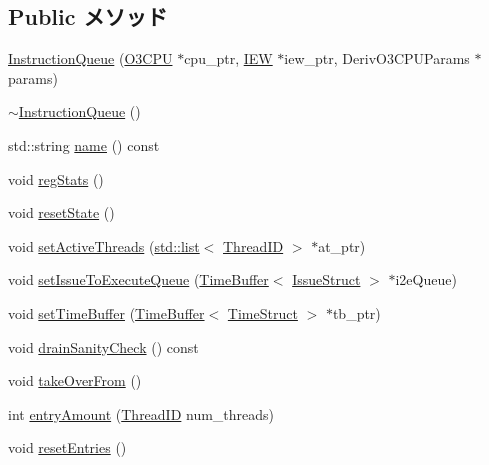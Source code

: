 \subsection*{Public メソッド}
\begin{DoxyCompactItemize}
\item 
\hyperlink{classInstructionQueue_a70773a251ef988cdd7b3fa494aed7a72}{InstructionQueue} (\hyperlink{classInstructionQueue_a44622cf06940413482836cb62931ac3f}{O3CPU} $\ast$cpu\_\-ptr, \hyperlink{classInstructionQueue_a23f60a4095b5240dfcb18a4ec40210a9}{IEW} $\ast$iew\_\-ptr, DerivO3CPUParams $\ast$params)
\item 
\hyperlink{classInstructionQueue_a80656aa048fa902ea6e652373a9d4c58}{$\sim$InstructionQueue} ()
\item 
std::string \hyperlink{classInstructionQueue_a37627d5d5bba7f4a8690c71c2ab3cb07}{name} () const 
\item 
void \hyperlink{classInstructionQueue_a4dc637449366fcdfc4e764cdf12d9b11}{regStats} ()
\item 
void \hyperlink{classInstructionQueue_a755ee993c2d4e9d422c37990b15afa37}{resetState} ()
\item 
void \hyperlink{classInstructionQueue_aab96bdacf8bd420402cbb543f994e054}{setActiveThreads} (\hyperlink{classstd_1_1list}{std::list}$<$ \hyperlink{base_2types_8hh_ab39b1a4f9dad884694c7a74ed69e6a6b}{ThreadID} $>$ $\ast$at\_\-ptr)
\item 
void \hyperlink{classInstructionQueue_a7cbe625b8c47621898e7ca92d70c826b}{setIssueToExecuteQueue} (\hyperlink{classTimeBuffer}{TimeBuffer}$<$ \hyperlink{structIssueStruct}{IssueStruct} $>$ $\ast$i2eQueue)
\item 
void \hyperlink{classInstructionQueue_a2b521ea5f191fff72265f60d4ed5187b}{setTimeBuffer} (\hyperlink{classTimeBuffer}{TimeBuffer}$<$ \hyperlink{structTimeStruct}{TimeStruct} $>$ $\ast$tb\_\-ptr)
\item 
void \hyperlink{classInstructionQueue_a0240eb42fa57fe5d3788093f62b77347}{drainSanityCheck} () const 
\item 
void \hyperlink{classInstructionQueue_a8674059ce345e23aac5086b2c3e24a43}{takeOverFrom} ()
\item 
int \hyperlink{classInstructionQueue_a5d2b0e4e7d98ea4ebd9fb98ac0d91e2f}{entryAmount} (\hyperlink{base_2types_8hh_ab39b1a4f9dad884694c7a74ed69e6a6b}{ThreadID} num\_\-threads)
\item 
void \hyperlink{classInstructionQueue_aaf9a05771a835f9f8d634cef36e24d40}{resetEntries} ()
\item 

\end{DoxyCompactItemize}
